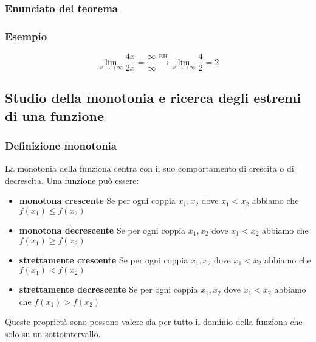 \documentclass{article}
\begin{document}
\subsubsection{Enunciato del teorema}


\subsubsection{Esempio}
\begin{equation*}
    \lim_{x \to +\infty} \frac{4x}{2x} = \frac{\infty}{\infty}
    \overset{\text{BH}}{\longrightarrow} \lim_{x \to +\infty} \frac{4}{2} = 2
\end{equation*}

\newpage
\subsection{Studio della monotonia e ricerca degli estremi di una funzione}

\subsubsection{Definizione monotonia}

La monotonia della funziona centra con il suo comportamento di crescita o di decrescita.
Una funzione può essere:
\begin{itemize}
    \item \textbf{monotona crescente} Se per ogni coppia \(x_1,x_2\) dove \(x_1 < x_2\) abbiamo che \(f(x_1) \leq f(x_2)\)
    \item \textbf{monotona decrescente} Se per ogni coppia \(x_1,x_2\) dove \(x_1 < x_2\) abbiamo che \(f(x_1) \geq f(x_2)\) 
    \item \textbf{strettamente crescente} Se per ogni coppia \(x_1,x_2\) dove \(x_1 < x_2\) abbiamo che \(f(x_1) < f(x_2)\)
    \item \textbf{strettamente decrescente} Se per ogni coppia \(x_1,x_2\) dove \(x_1 < x_2\) abbiamo che \(f(x_1) > f(x_2)\)
\end{itemize}
Queste proprietà sono possono valere sia per tutto il dominio della funziona che solo su un sottointervallo.
\end{document}
